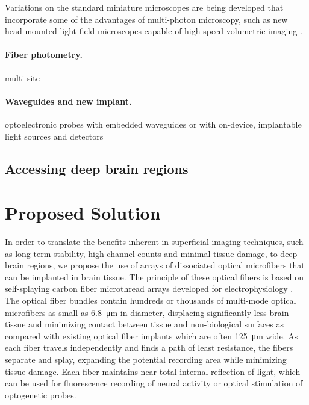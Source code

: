 Variations on the standard miniature microscopes are being 
developed that incorporate some of the advantages of multi-photon
microscopy, such as new head-mounted light-field microscopes 
capable of high speed volumetric imaging \cite{Skocek:2018hs}.

\paragraph{Fiber photometry.} %

\cite{Adelsberger:2005dy,Cui:2013dq,Adelsberger:2014jd,Gunaydin:2014dh}

multi-site

\cite{Guo:2015gu}

\paragraph{Waveguides and new implant.} 

optoelectronic probes with embedded 
waveguides or with on-device, implantable light sources and 
detectors \cite{Warden:2014bx,Wu:2015gk,Segev:2017en}



\subsection{Accessing deep brain regions}

\section{Proposed Solution}


In order to translate the benefits inherent in superficial 
imaging techniques, such as long-term stability, high-channel 
counts and minimal tissue damage, to deep brain regions, we 
propose the use of arrays of dissociated optical microfibers 
that can be implanted in brain tissue. The principle of these 
optical fibers is based on self-splaying carbon fiber microthread 
arrays developed for electrophysiology 
\cite{Guitchounts:2013bs,Markowitz:2015ko}. The optical fiber 
bundles contain hundreds or thousands of multi-mode 
optical microfibers as small as 6.8~\si{\micro\meter} in diameter, 
displacing significantly less brain tissue and minimizing 
contact between tissue and non-biological surfaces as 
compared with existing optical fiber implants which are
often 125~\si{\micro\meter} wide. As each fiber travels independently 
and finds a path of least resistance, the fibers 
separate and splay, expanding the potential recording area 
while minimizing tissue damage. Each fiber maintains near total 
internal reflection of light,
which can be used for fluorescence recording of neural activity or optical stimulation of optogenetic probes.

